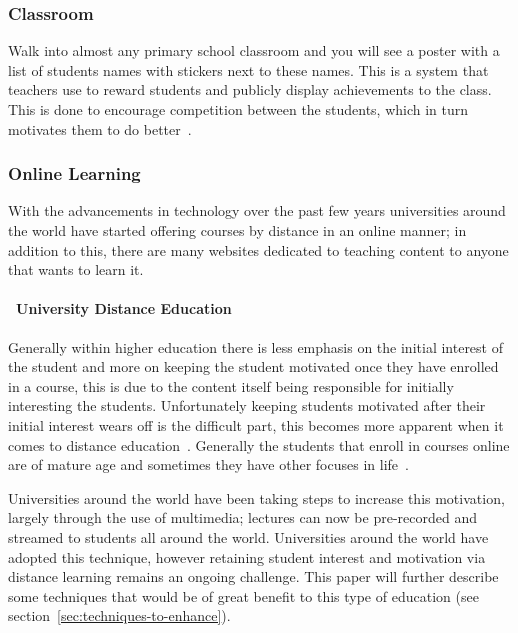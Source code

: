 \documentclass[a4paper,12pt]{article}
\begin{document}
\subsubsection{Classroom}\label{sec:classroom}
Walk into almost any primary school classroom and you will see a poster with a list of students names with stickers next to these names. This is a system that teachers use to reward students and publicly display achievements to the class. This is done to encourage competition between the students, which in turn motivates them to do better~\citep{school-kids}.

\subsubsection{Online Learning}
With the advancements in technology over the past few years universities around the world have started offering courses by distance in an online manner; in addition to this, there are many websites dedicated to teaching content to anyone that wants to learn it.

\paragraph{\indent~University Distance Education\\}
Generally within higher education there is less emphasis on the initial interest of the student and more on keeping the student motivated once they have enrolled in a course, this is due to the content itself being responsible for initially interesting the students. Unfortunately keeping students motivated after their initial interest wears off is the difficult part, this becomes more apparent when it comes to distance education~\citep{distance-education}.
Generally the students that enroll in courses online are of mature age and sometimes they have other focuses in life~\citep{distance-education}.

\par
Universities around the world have been taking steps to increase this motivation, largely through the use of multimedia; lectures can now be pre-recorded and streamed to students all around the world. Universities around the world have adopted this technique, however retaining student interest and motivation via distance learning remains an ongoing challenge. This paper will further describe some techniques that would be of great benefit to this type of education (see section~\ref{sec:techniques-to-enhance}).
\end{document}
